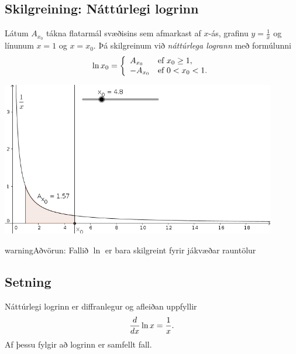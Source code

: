 \documentclass[b5paper,10pt,icelandic]{sphinxmanual}
\begin{document}
\subsection{Skilgreining: Náttúrlegi logrinn}
\label{kafli04:index-0}\label{kafli04:skilgreining-natturlegi-logrinn}
Látum \(A_{x_0}\) tákna flatarmál svæðisins sem afmarkast af
\(x\)-ás, grafinu \(y=\frac{1}{x}\) og línunum \(x=1\) og
\(x=x_0\). Þá skilgreinum við \textit{náttúrlega logrann} með formúlunni
\begin{gather}
\begin{split}\ln x_0 =\left\{\begin{array}{ll}
A_{x_0} & \mbox{ef }x_0 \geq 1,\\
-A_{x_0} & \mbox{ef }0<x_0<1.
\end{array}
\right.\end{split}\notag
\end{gather}

\begin{center}
\includegraphics[width=12cm,keepaspectratio=true]{01_ln.png}
\end{center}


\begin{notice}{warning}{Aðvörun:}
Fallið \(\ln\) er bara skilgreint fyrir jákvæðar rauntölur
\end{notice}


\subsection{Setning}
\label{kafli04:setning}
Náttúrlegi logrinn er diffranlegur og afleiðan uppfyllir
\begin{gather}
\begin{split}\frac{d}{dx}\ln x=\frac{1}{x}.\end{split}\notag
\end{gather}
Af þessu fylgir að logrinn er samfellt fall.
\end{document}
